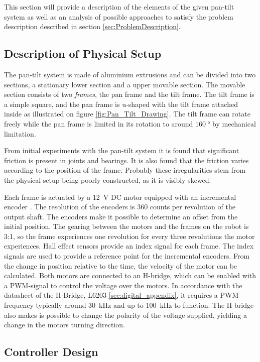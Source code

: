 \documentclass[../../main.tex]{subfiles}
\begin{document}
This section will provide a description of the elements of the given pan-tilt system as well as an analysis of possible approaches to satisfy the problem description described in section \ref{sec:ProblemDescription}.

\subsection{Description of Physical Setup}
The pan-tilt system is made of aluminium extrusions and can be divided into two sections, a stationary lower section and a upper movable section. The movable section consists of two \textit{frames}, the pan frame and the tilt frame. The tilt frame is a simple square, and the pan frame is u-shaped with the tilt frame attached inside as illustrated on figure \ref{fig:Pan_Tilt_Drawing}. The tilt frame can rotate freely while the pan frame is limited in its rotation to around $\SI{160}{\degree}$ by mechanical limitation.

From initial experiments with the pan-tilt system it is found that significant friction is present in joints and bearings. It is also found that the friction varies according to the position of the frame. Probably these irregularities stem from the physical setup being poorly constructed, as it is visibly skewed.  

Each frame is actuated by a \SI{12}{\volt} DC motor equipped with an incremental encoder \cite{Encoder}. The resolution of the encoders is 360 counts per revolution of the output shaft. The encoders make it possible to determine an offset from the initial position. The gearing between the motors and the frames on the robot is 3:1, so the frame experiences one revolution for every three revolutions the motor experiences. Hall effect sensors provide an index signal for each frame. The index signals are used to provide a reference point for the incremental encoders. From the change in position relative to the time, the velocity of the motor can be calculated. Both motors are connected to an H-bridge, which can be enabled with a PWM-signal to control the voltage over the motors. In accordance with the datasheet of the H-Bridge, L6203 \cite{Hbridge} \ref{sec:digital_appendix}, it requires a PWM frequency typically around \SI{30}{\kilo\hertz} and up to \SI{100}{\kilo\hertz} to function. The H-bridge also makes is possible to change the polarity of the voltage supplied, yielding a change in the motors turning direction.

\subsection{Controller Design}
\end{document}
